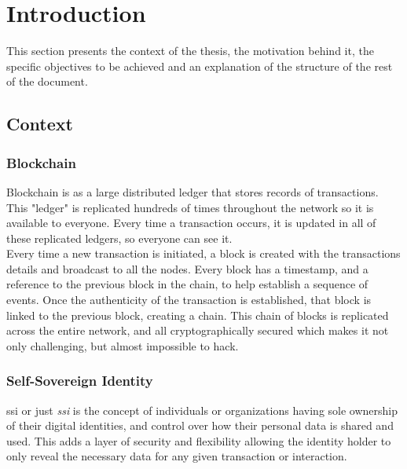 \documentclass[a4paper, 12pt]{article} %
\begin{document}
\newpage
{} %
\UseRawInputEncoding %

\section{Introduction}
    This section presents the context of the thesis, the motivation behind it, the specific objectives to be achieved and an explanation of the structure of the rest of the document.
    
    \subsection{Context}
        \subsubsection{Blockchain}
            Blockchain\cite{blockchain-sum,blockchainGartner} is as a large distributed ledger that stores records of transactions. This "ledger" is replicated hundreds of times throughout the network so it is available to everyone. Every time a transaction occurs, it is updated in all of these replicated ledgers, so everyone can see it.\\
            
            Every time a new transaction is initiated, a block is created with the transactions details and broadcast to all the nodes. Every block has a timestamp, and a reference to the previous block in the chain, to help establish a sequence of events. Once the authenticity of the transaction is established, that block is linked to the previous block, creating a chain. This chain of blocks is replicated across the entire network, and all cryptographically secured which makes it not only challenging, but almost impossible to hack.
            
        \subsubsection{Self-Sovereign Identity}
            \acrlong{ssi} or just \textit{\acrshort{ssi}}\cite{ssi} is the concept of individuals or organizations having sole ownership of their digital identities, and control over how their personal data is shared and used. This adds a layer of security and flexibility allowing the identity holder to only reveal the necessary data for any given transaction or interaction.\\
            
\end{document}
